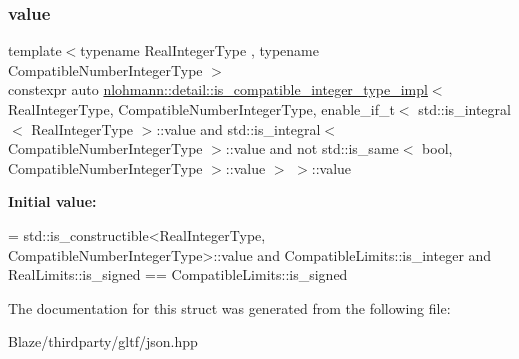 \subsubsection{\texorpdfstring{value}{value}}
{\footnotesize\ttfamily template$<$typename Real\+Integer\+Type , typename Compatible\+Number\+Integer\+Type $>$ \\
constexpr auto \hyperlink{structnlohmann_1_1detail_1_1is__compatible__integer__type__impl}{nlohmann\+::detail\+::is\+\_\+compatible\+\_\+integer\+\_\+type\+\_\+impl}$<$ Real\+Integer\+Type, Compatible\+Number\+Integer\+Type, enable\+\_\+if\+\_\+t$<$ std\+::is\+\_\+integral$<$ Real\+Integer\+Type $>$\+::value and std\+::is\+\_\+integral$<$ Compatible\+Number\+Integer\+Type $>$\+::value and not std\+::is\+\_\+same$<$ bool, Compatible\+Number\+Integer\+Type $>$\+::value $>$ $>$\+::value\hspace{0.3cm}{\ttfamily [static]}}

{\bfseries Initial value\+:}
\begin{DoxyCode}
=
                std::is\_constructible<RealIntegerType,
                CompatibleNumberIntegerType>::value and
                CompatibleLimits::is\_integer and
                RealLimits::is\_signed == CompatibleLimits::is\_signed
\end{DoxyCode}


The documentation for this struct was generated from the following file\+:\begin{DoxyCompactItemize}
\item 
Blaze/thirdparty/gltf/json.\+hpp\end{DoxyCompactItemize}
